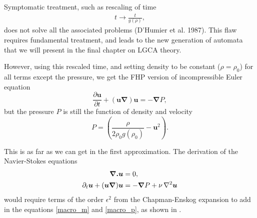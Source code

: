 Symptomatic treatment, such as rescaling of time
\begin{align} \label{frac_resc}
t \rightarrow \frac{t}{g(\rho)},
\end{align}
does not solve all the associated problems (D'Humier et al. 1987).
This flaw requires fundamental treatment, and leads to the new generation of automata that we will present in the final chapter on LGCA theory.

However, using this rescaled time, and setting density to be constant ($\rho = \rho_0$) for all terms except the pressure, we get the FHP version of incompressible Euler equation
\begin{equation}
\frac{\partial \bm{u}}{\partial t} + (\bm{u} \bm{\nabla}) \bm{u} = -\bm{\nabla} P,
\end{equation}
but the pressure $P$ is still the function of density and velocity
\begin{equation} \label{press}
P = (\frac{\rho}{2\rho_0 g(\rho_0)} - \bm{u}^2).
\end{equation}

This is as far as we can get in the first approximation.
The derivation of the Navier-Stokes equations
\begin{align}
\begin{split}
\bm{\nabla . u} &= 0, \\
\partial_t \bm{u} + (\bm{u \nabla})\bm{u} &= - \bm{\nabla} P + \nu \, \nabla^2 \bm{u}
\end{split}
\end{align}
would require terms of the order $\epsilon^2$  from the Chapman-Enskog expansion to add in the equations \ref{macro_m} and \ref{macro_p}, as shown in \cite{frisch}.

%

 
% 
%
%

